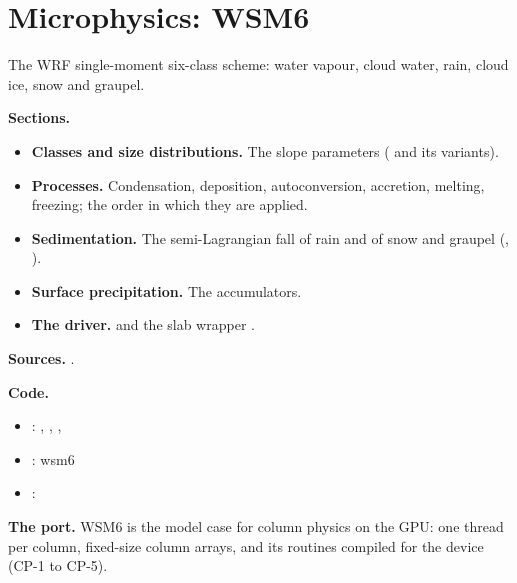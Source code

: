 \chapter{Microphysics: WSM6}\label{ch:mp}

The WRF single-moment six-class scheme: water vapour, cloud water, rain, cloud ice, snow and graupel.

\begin{outline}[(card B-08)]
\textbf{Sections.}
\begin{itemize}
    \item \textbf{Classes and size distributions.} The slope parameters ( and its variants).
    \item \textbf{Processes.} Condensation, deposition, autoconversion, accretion, melting, freezing; the order in which they are applied.
    \item \textbf{Sedimentation.} The semi-Lagrangian fall of rain and of snow and graupel (, ).
    \item \textbf{Surface precipitation.} The accumulators.
    \item \textbf{The driver.}  and the slab wrapper .
\end{itemize}
\textbf{Sources.} \citet{hong2006wsm6}.

\textbf{Code.}
\begin{itemize}
    \item {}: , , , 
    \item {}: wsm6
    \item {}: 
\end{itemize}
\textbf{The port.} WSM6 is the model case for column physics on the GPU: one thread per column, fixed-size column arrays, and its routines compiled for the device (CP-1 to CP-5).
\end{outline}
